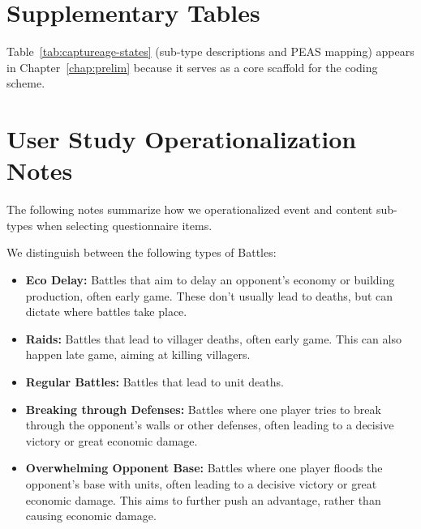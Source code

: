 \section{Supplementary Tables}
\label{appendix:domain-analysis-supplementary-tables}

Table~\ref{tab:captureage-states} (sub-type descriptions and PEAS mapping) appears in Chapter~\ref{chap:prelim} because it serves as a core scaffold for the coding scheme.

\section{User Study Operationalization Notes}
\label{appendix:prelim-operationalization}

The following notes summarize how we operationalized event and content sub-types when selecting questionnaire items.

We distinguish between the following types of Battles:
\begin{itemize}
  \item \textbf{Eco Delay:} Battles that aim to delay an opponent's economy or building production, often early game. These don't usually lead to deaths, but can dictate where battles take place.
  \item \textbf{Raids:} Battles that lead to villager deaths, often early game. This can also happen late game, aiming at killing villagers.
  \item \textbf{Regular Battles:} Battles that lead to unit deaths.
  \item \textbf{Breaking through Defenses:} Battles where one player tries to break through the opponent's walls or other defenses, often leading to a decisive victory or great economic damage.
  \item \textbf{Overwhelming Opponent Base:} Battles where one player floods the opponent's base with units, often leading to a decisive victory or great economic damage. This aims to further push an advantage, rather than causing economic damage.
\end{itemize}

